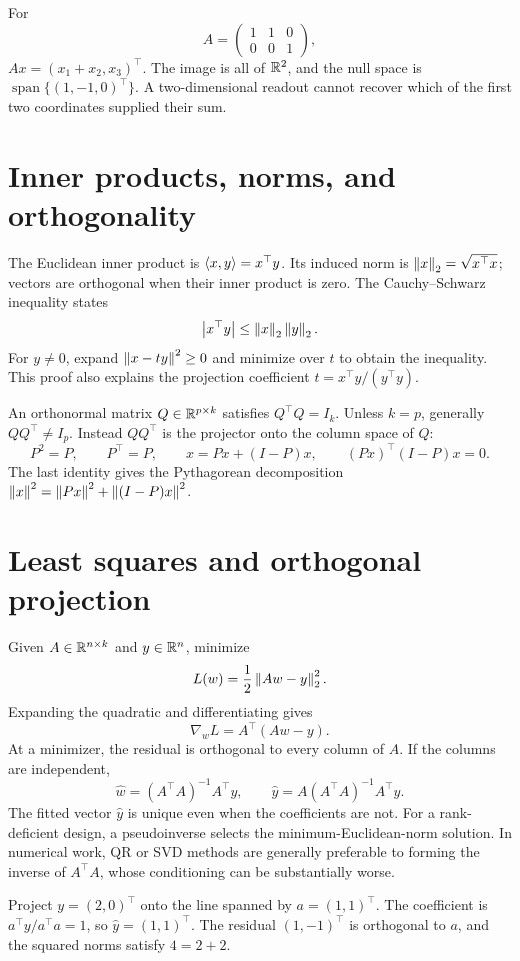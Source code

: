 \begin{example}
For
\[
A=\begin{pmatrix}1&1&0\\0&0&1\end{pmatrix},
\]
\(Ax=(x_1+x_2,x_3)^\top\). The image is all of \(\mathbb{R}^2\), and the null space is \(\operatorname{span}\{(1,-1,0)^\top\}\). A two-dimensional readout cannot recover which of the first two coordinates supplied their sum.
\end{example}

\section{Inner products, norms, and orthogonality}
The Euclidean inner product is \(\left\langle x,y\right\rangle=x^\top y\). Its induced norm is \(\left\lVert x\right\rVert_2=\sqrt{x^\top x}\); vectors are orthogonal when their inner product is zero. The Cauchy--Schwarz inequality states
\[
\left\lvert x^\top y\right\rvert\leq\left\lVert x\right\rVert_2\left\lVert y\right\rVert_2.
\]
For \(y\ne0\), expand \(\left\lVert x-ty\right\rVert^2\geq0\) and minimize over \(t\) to obtain the inequality. This proof also explains the projection coefficient \(t=x^\top y/(y^\top y)\).

An orthonormal matrix \(Q\in\mathbb{R}^{p\times k}\) satisfies \(Q^\top Q=I_k\). Unless \(k=p\), generally \(QQ^\top\ne I_p\). Instead \(QQ^\top\) is the projector onto the column space of \(Q\):
\[
P^2=P,\qquad P^\top=P,\qquad
x=Px+(I-P)x,\qquad (Px)^\top(I-P)x=0.
\]
The last identity gives the Pythagorean decomposition \(\left\lVert x\right\rVert^2=\left\lVert Px\right\rVert^2+\left\lVert (I-P)x\right\rVert^2\).

\section{Least squares and orthogonal projection}
Given \(A\in\mathbb{R}^{n\times k}\) and \(y\in\mathbb{R}^n\), minimize
\[
L(w)=\frac12\left\lVert Aw-y\right\rVert_2^2.
\]
Expanding the quadratic and differentiating gives
\[
\nabla_wL=A^\top(Aw-y).
\]
At a minimizer, the residual is orthogonal to every column of \(A\). If the columns are independent,
\[
\widehat w=(A^\top A)^{-1}A^\top y,\qquad
\widehat y=A(A^\top A)^{-1}A^\top y.
\]
The fitted vector \(\widehat y\) is unique even when the coefficients are not. For a rank-deficient design, a pseudoinverse selects the minimum-Euclidean-norm solution. In numerical work, QR or SVD methods are generally preferable to forming the inverse of \(A^\top A\), whose conditioning can be substantially worse.

\begin{example}
Project \(y=(2,0)^\top\) onto the line spanned by \(a=(1,1)^\top\). The coefficient is \(a^\top y/a^\top a=1\), so \(\widehat y=(1,1)^\top\). The residual \((1,-1)^\top\) is orthogonal to \(a\), and the squared norms satisfy \(4=2+2\).
\end{example}

